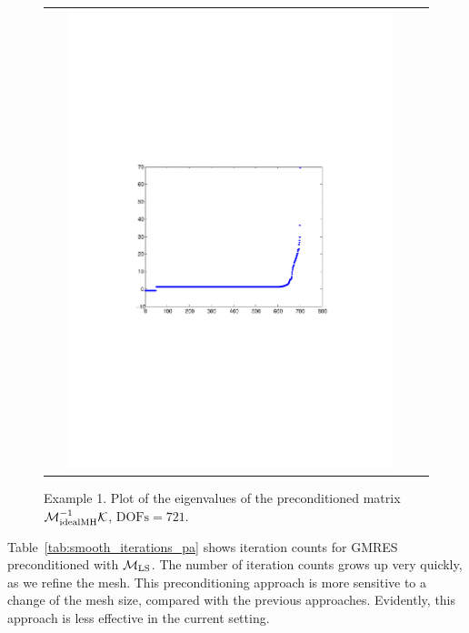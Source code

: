 \documentclass{siamltex}
\begin{document}
\begin{figure}[ht]
\begin{center}
\begin{tabular}{cc}\\
\includegraphics[width=0.9\textwidth]{figs/smooth_outer_eigs_N8.pdf}
\end{tabular}
\end{center}
\caption {Example 1. Plot of the eigenvalues of the preconditioned matrix $\mathcal{M}_{\rm idealMH}^{-1} \mathcal{K}$, $\mathrm{DOFs} = 721$.}
\label{fig:pc_inner_eigs_smooth}
\end{figure}


Table~\ref{tab:smooth_iterations_pa} shows iteration counts for GMRES preconditioned with $\mathcal{M}_{\rm LS}$. The number of iteration counts grows up very quickly, as we refine the mesh. This preconditioning approach is more sensitive to a change of the mesh size, compared with the previous approaches. Evidently, this approach is less effective in the current setting.
\end{document}
